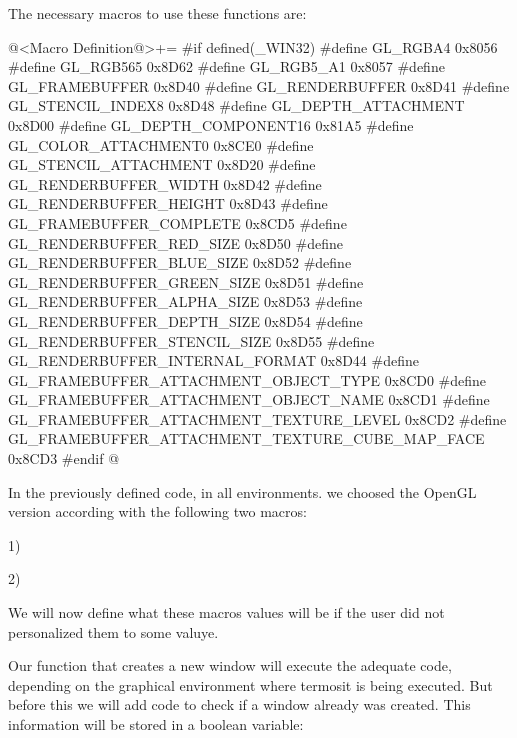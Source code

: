 The necessary macros to use these functions are:

\iniciocodigo
@<Macro Definition@>+=
#if defined(_WIN32)
#define GL_RGBA4                                        0x8056
#define GL_RGB565                                       0x8D62
#define GL_RGB5_A1                                      0x8057
#define GL_FRAMEBUFFER                                  0x8D40
#define GL_RENDERBUFFER                                 0x8D41
#define GL_STENCIL_INDEX8                               0x8D48
#define GL_DEPTH_ATTACHMENT                             0x8D00
#define GL_DEPTH_COMPONENT16                            0x81A5
#define GL_COLOR_ATTACHMENT0                            0x8CE0
#define GL_STENCIL_ATTACHMENT                           0x8D20
#define GL_RENDERBUFFER_WIDTH                           0x8D42
#define GL_RENDERBUFFER_HEIGHT                          0x8D43
#define GL_FRAMEBUFFER_COMPLETE                         0x8CD5
#define GL_RENDERBUFFER_RED_SIZE                        0x8D50
#define GL_RENDERBUFFER_BLUE_SIZE                       0x8D52
#define GL_RENDERBUFFER_GREEN_SIZE                      0x8D51
#define GL_RENDERBUFFER_ALPHA_SIZE                      0x8D53
#define GL_RENDERBUFFER_DEPTH_SIZE                      0x8D54
#define GL_RENDERBUFFER_STENCIL_SIZE                    0x8D55
#define GL_RENDERBUFFER_INTERNAL_FORMAT                 0x8D44
#define GL_FRAMEBUFFER_ATTACHMENT_OBJECT_TYPE           0x8CD0
#define GL_FRAMEBUFFER_ATTACHMENT_OBJECT_NAME           0x8CD1
#define GL_FRAMEBUFFER_ATTACHMENT_TEXTURE_LEVEL         0x8CD2
#define GL_FRAMEBUFFER_ATTACHMENT_TEXTURE_CUBE_MAP_FACE 0x8CD3
#endif
@
\fimcodigo



In the previously defined code, in all environments. we choosed the
OpenGL version according with the following two macros:

1) 

2) 

We will now define what these macros values will be if the user did
not personalized them to some valuye.


Our function that creates a new window will execute the adequate code,
depending on the graphical environment where termosit is being
executed. But before this we will add code to check if a window
already was created. This information will be stored in a boolean
variable:

